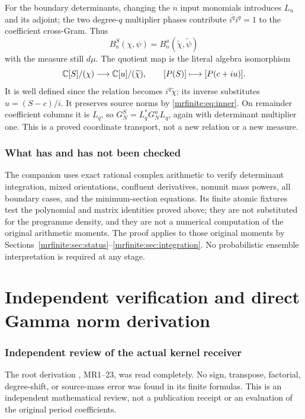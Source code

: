 \documentclass[11pt]{article}
\begin{document}
For the boundary determinants, changing the \(n\) input monomials
introduces \(L_n\) and its adjoint; the two degree-\(q\) multiplier
phases contribute \(\overline{i^q}i^q=1\) to the coefficient
cross-Gram. Thus
\[
 B_n^S(\chi,\psi)=B_n^u(\widetilde\chi,\widetilde\psi)
\]
with the measure still \(d\mu\). The quotient map is the literal
algebra isomorphism
\[
 \mathbb C[S]/(\chi)\longrightarrow\mathbb C[u]/(\widetilde\chi),
 \qquad[P(S)]\longmapsto[P(c+iu)].
\]
It is well defined since the relation becomes
\(i^q\widetilde\chi\); its inverse substitutes \(u=(S-c)/i\).
It preserves source norms by \eqref{mrfinite:eq:inner}. On remainder coefficient
columns it is \(L_q\), so
\(G_N^S=L_q^*G_N^uL_q\), again with determinant multiplier one.
This is a proved coordinate transport, not a new relation or a new
measure.

\section{What has and has not been checked}\label{mrfinite:sec:checks}

The companion  uses exact rational complex
arithmetic to verify determinant integration, mixed orientations,
confluent derivatives, nonunit mass powers, all boundary cases, and the
minimum-section equations. Its finite atomic fixtures test the
polynomial and matrix identities proved above; they are not substituted
for the programme density, and they are not a numerical computation of
the original arithmetic moments. The proof applies to those original
moments by Sections~\ref{mrfinite:sec:status}--\ref{mrfinite:sec:integration}.
No probabilistic ensemble interpretation is required at any stage.

\endgroup

\clearpage\begingroup
\part*{Independent verification and direct Gamma norm derivation}
\providecommand{\mrreviewtightlist}{\setlength{\itemsep}{0pt}\setlength{\parskip}{0pt}}

\section{Independent review of the actual kernel receiver}\label{mrreview:independent-review-of-the-actual-kernel-receiver}

The root derivation , MR1--23, was read completely. No sign, transpose, factorial, degree-shift, or source-mass error was found in its finite formulas. This is an independent mathematical review, not a publication receipt or an evaluation of the original period coefficients.
\end{document}
